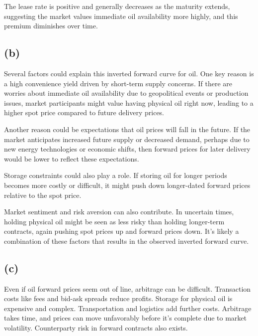 The lease rate is positive and generally decreases as the maturity
extends, suggesting the market values immediate oil availability more
highly, and this premium diminishes over time.

\subsection{(b)}\label{b}

Several factors could explain this inverted forward curve for oil. One
key reason is a high convenience yield driven by short-term supply
concerns. If there are worries about immediate oil availability due to
geopolitical events or production issues, market participants might
value having physical oil right now, leading to a higher spot price
compared to future delivery prices.

Another reason could be expectations that oil prices will fall in the
future. If the market anticipates increased future supply or decreased
demand, perhaps due to new energy technologies or economic shifts, then
forward prices for later delivery would be lower to reflect these
expectations.

Storage constraints could also play a role. If storing oil for longer
periods becomes more costly or difficult, it might push down
longer-dated forward prices relative to the spot price.

Market sentiment and risk aversion can also contribute. In uncertain
times, holding physical oil might be seen as less risky than holding
longer-term contracts, again pushing spot prices up and forward prices
down. It's likely a combination of these factors that results in the
observed inverted forward curve.

\subsection{(c)}\label{c}

Even if oil forward prices seem out of line, arbitrage can be difficult.
Transaction costs like fees and bid-ask spreads reduce profits. Storage
for physical oil is expensive and complex. Transportation and logistics
add further costs. Arbitrage takes time, and prices can move unfavorably
before it's complete due to market volatility. Counterparty risk in
forward contracts also exists.

